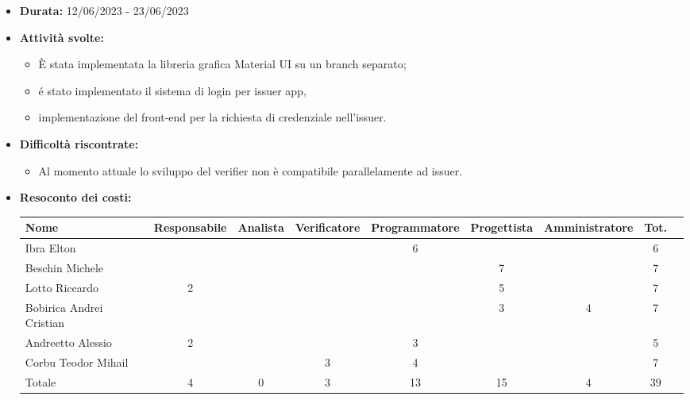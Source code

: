 \begin{itemize}
    \item \textbf{Durata:} 12/06/2023 - 23/06/2023 
    \item \textbf{Attività svolte:}
    \begin{itemize}
        \item È stata implementata la libreria grafica Material UI su un branch separato;
        \item é stato implementato il sistema di login per issuer app, 
        \item implementazione del front-end per la richiesta di credenziale nell'issuer.
    \end{itemize}
    \item \textbf{Difficoltà riscontrate:}
    \begin{itemize}
        \item Al momento attuale lo sviluppo del verifier non è compatibile parallelamente ad issuer.
    \end{itemize}
    \item \textbf{Resoconto dei costi:}
    \begin{longtable}{|p{}|c|c|c|c|c|c|c|c|}
        \hline
        Nome & Responsabile & Analista & Verificatore & Programmatore & Progettista & Amministratore & Tot.\\
        \hline
        Ibra Elton & & & &6 & & &6\\
        \hline
        Beschin Michele & & & & &7 & &7 \\
        \hline
        Lotto Riccardo &2 & & & &5 & &7 \\
        \hline
        Bobirica Andrei Cristian & & & & &3 &4 &7 \\
        \hline
        Andreetto Alessio &2 & & &3 & & &5 \\
        \hline
        Corbu Teodor Mihail & & &3 &4 & & &7 \\
        \hline
        Totale &4 &0 &3 &13 &15 &4 &39 \\
        \hline
    \end{longtable}
    \end{itemize}

